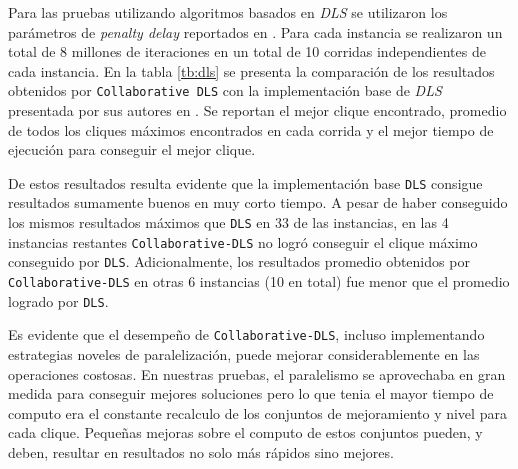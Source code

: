 \documentclass[conference]{IEEEtran}
\begin{document}
Para las pruebas utilizando algoritmos basados en \emph{DLS} se
utilizaron los parámetros de \emph{penalty delay} reportados en
\cite{dynamicl}. Para cada instancia se realizaron un total de 8
millones de iteraciones en un total de 10 corridas independientes de
cada instancia. En la tabla \ref{tb:dls} se presenta la comparación de
los resultados obtenidos por \texttt{Collaborative DLS} con la
implementación base de \emph{DLS} presentada por sus autores en
\cite{dynamicl}. Se reportan el mejor clique encontrado, promedio de
todos los cliques máximos encontrados en cada corrida y el mejor
tiempo de ejecución para conseguir el mejor clique.

De estos resultados resulta evidente que la implementación base
\texttt{DLS} consigue resultados sumamente buenos en muy corto
tiempo. A pesar de haber conseguido los mismos resultados máximos que
\texttt{DLS} en 33 de las instancias, en las 4 instancias restantes
\texttt{Collaborative-DLS} no logró conseguir el clique máximo
conseguido por \texttt{DLS}. Adicionalmente, los resultados promedio
obtenidos por \texttt{Collaborative-DLS} en otras 6 instancias (10 en
total) fue menor que el promedio logrado por \texttt{DLS}.

Es evidente que el desempeño de \texttt{Collaborative-DLS}, incluso
implementando estrategias noveles de paralelización, puede mejorar
considerablemente en las operaciones costosas. En nuestras pruebas,
el paralelismo se aprovechaba en gran medida para conseguir mejores
soluciones pero lo que tenia el mayor tiempo de computo era el
constante recalculo de los conjuntos de mejoramiento y nivel para cada
clique. Pequeñas mejoras sobre el computo de estos conjuntos pueden, y
deben, resultar en resultados no solo más rápidos sino mejores.
\end{document}
